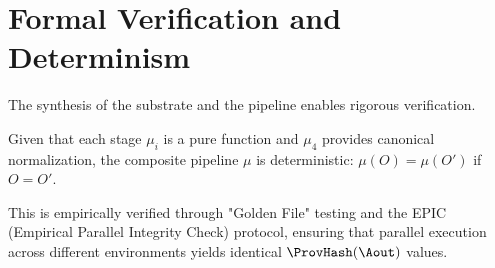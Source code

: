 \section{Formal Verification and Determinism}

The synthesis of the substrate and the pipeline enables rigorous verification.

\begin{theorem}
Given that each stage $\mu_i$ is a pure function and $\mu_4$ provides canonical normalization, the composite pipeline $\mu$ is deterministic: $\mu(O) = \mu(O')$ if $O = O'$.
\end{theorem}

This is empirically verified through "Golden File" testing and the EPIC (Empirical Parallel Integrity Check) protocol, ensuring that parallel execution across different environments yields identical $\ProvHash(\Aout)$ values.
